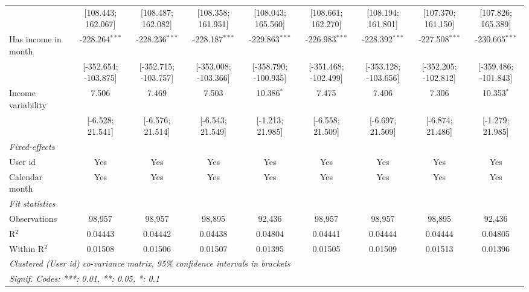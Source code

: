 \begin{table}[htbp]
\begin{threeparttable}[b]
\begin{tabular}{lcccccccc}
                                          & [108.443; 162.067]   & [108.487; 162.082]   & [108.358; 161.951]   & [108.043; 165.560]   & [108.661; 162.270]   & [108.194; 161.801]   & [107.370; 161.150]   & [107.826; 165.389]\\   
         Has income in month              & -228.264$^{***}$     & -228.236$^{***}$     & -228.187$^{***}$     & -229.863$^{***}$     & -226.983$^{***}$     & -228.392$^{***}$     & -227.508$^{***}$     & -230.665$^{***}$\\   
                                          & [-352.654; -103.875] & [-352.715; -103.757] & [-353.008; -103.366] & [-358.790; -100.935] & [-351.468; -102.499] & [-353.128; -103.656] & [-352.205; -102.812] & [-359.486; -101.843]\\   
         Income variability               & 7.506                & 7.469                & 7.503                & 10.386$^{*}$         & 7.475                & 7.406                & 7.306                & 10.353$^{*}$\\   
                                          & [-6.528; 21.541]     & [-6.576; 21.514]     & [-6.543; 21.549]     & [-1.213; 21.985]     & [-6.558; 21.509]     & [-6.697; 21.509]     & [-6.874; 21.486]     & [-1.279; 21.985]\\   
         \midrule
         \emph{Fixed-effects}\\
         User id                          & Yes                  & Yes                  & Yes                  & Yes                  & Yes                  & Yes                  & Yes                  & Yes\\  
         Calendar month                   & Yes                  & Yes                  & Yes                  & Yes                  & Yes                  & Yes                  & Yes                  & Yes\\  
         \midrule
         \emph{Fit statistics}\\
         Observations                     & 98,957               & 98,957               & 98,895               & 92,436               & 98,957               & 98,957               & 98,895               & 92,436\\  
         R$^2$                            & 0.04443              & 0.04442              & 0.04438              & 0.04804              & 0.04441              & 0.04444              & 0.04444              & 0.04805\\  
         Within R$^2$                     & 0.01508              & 0.01506              & 0.01507              & 0.01395              & 0.01505              & 0.01509              & 0.01513              & 0.01396\\  
         \midrule \midrule
         \multicolumn{9}{l}{\emph{Clustered (User id) co-variance matrix, 95\% confidence intervals in brackets}}\\
         \multicolumn{9}{l}{\emph{Signif. Codes: ***: 0.01, **: 0.05, *: 0.1}}\\
      \end{tabular}
   \end{threeparttable}
\end{table}


